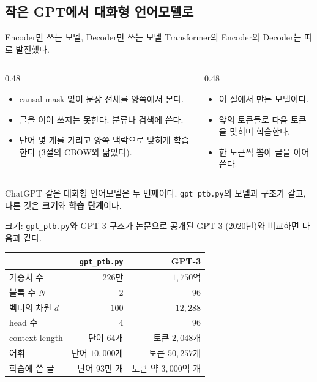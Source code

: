\documentclass[aspectratio=169,11pt]{beamer}
\begin{document}
\subsection{작은 GPT에서 대화형 언어모델로}

\begin{frame}{Encoder만 쓰는 모델, Decoder만 쓰는 모델}
Transformer의 Encoder와 Decoder는 따로 발전했다.
\vskip1mm
\begin{columns}[T,onlytextwidth]
\begin{column}{0.48\textwidth}
\begin{remarkbox}
\small
\begin{itemize}
\item causal mask 없이 문장 전체를 양쪽에서 본다.
\item 글을 이어 쓰지는 못한다. 분류나 검색에 쓴다.
\item 단어 몇 개를 가리고 양쪽 맥락으로 맞히게 학습한다 (3절의 CBOW와 닮았다).
\end{itemize}
\end{remarkbox}
\end{column}
\begin{column}{0.48\textwidth}
\begin{keybox}
\small
\begin{itemize}
\item 이 절에서 만든 모델이다.
\item 앞의 토큰들로 다음 토큰을 맞히며 학습한다.
\item 한 토큰씩 뽑아 글을 이어 쓴다.
\end{itemize}
\end{keybox}
\end{column}
\end{columns}
\vskip2mm
ChatGPT 같은 대화형 언어모델은 두 번째이다.
\texttt{gpt\_ptb.py}의 모델과 구조가 같고, 다른 것은 \textbf{크기}와 \textbf{학습 단계}이다.
\end{frame}

\begin{frame}{크기: \texttt{gpt\_ptb.py}와 GPT-3}
구조가 논문으로 공개된 GPT-3 (2020년)와 비교하면 다음과 같다.
\begin{center}
\begin{tabular}{@{}lrr@{}}
\toprule
& \texttt{gpt\_ptb.py} & GPT-3 \\
\midrule
가중치 수 & $226$만 & $1{,}750$억 \\
블록 수 $N$ & $2$ & $96$ \\
벡터의 차원 $d$ & $100$ & $12{,}288$ \\
head 수 & $4$ & $96$ \\
context length & 단어 $64$개 & 토큰 $2{,}048$개 \\
어휘 & 단어 $10{,}000$개 & 토큰 $50{,}257$개 \\
학습에 쓴 글 & 단어 $93$만 개 & 토큰 약 $3{,}000$억 개 \\
\bottomrule
\end{tabular}
\end{center}
\end{frame}
\end{document}
